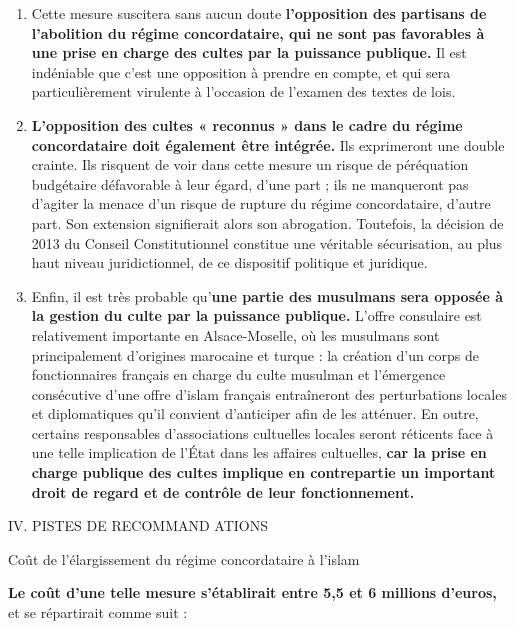 \begin{enumerate}
\def\labelenumi{\alph{enumi}.}
\item
  Cette mesure suscitera sans aucun doute \textbf{l'opposition des
  partisans de l'abolition du régime concordataire, qui ne sont pas
  favorables à une prise en charge des cultes par la puissance
  publique.} Il est indéniable que c'est une opposition à prendre en
  compte, et qui sera particulièrement virulente à l'occasion de
  l'examen des textes de lois.
\item
  
  \textbf{L'opposition des cultes « reconnus » dans le cadre du régime
  concordataire doit également être intégrée.} Ils exprimeront une
  double crainte. Ils risquent de voir dans cette mesure un risque de
  péréquation budgétaire défavorable à leur égard, d'une part ; ils ne
  manqueront pas d'agiter la menace d'un risque de rupture du régime
  concordataire, d'autre part. Son extension signifierait alors son
  abrogation. Toutefois, la décision de 2013 du Conseil Constitutionnel
  constitue une véritable sécurisation, au plus haut niveau
  juridictionnel, de ce dispositif politique et juridique.
  
\item
  
  Enfin, il est très probable qu'\textbf{une partie des musulmans sera
  opposée à la gestion du culte par la puissance publique.} L'offre
  consulaire est relativement importante en Alsace-Moselle, où les
  musulmans sont principalement d'origines marocaine et turque : la
  création d'un corps de fonctionnaires français en charge du culte
  musulman et l'émergence consécutive d'une offre d'islam français
  entraîneront des perturbations locales et diplomatiques qu'il convient
  d'anticiper afin de les atténuer. En outre, certains responsables
  d'associations cultuelles locales seront réticents face à une telle
  implication de l'État dans les affaires cultuelles, \textbf{car la
  prise en charge publique des cultes implique en contrepartie un
  important droit de regard et de contrôle de leur fonctionnement.}
  
\end{enumerate}


IV. PISTES DE RECOMMAND ATIONS


Coût de l'élargissement du régime concordataire à l'islam


\textbf{Le coût d'une telle mesure s'établirait entre 5,5 et 6 millions
d'euros,} et se répartirait comme suit :


